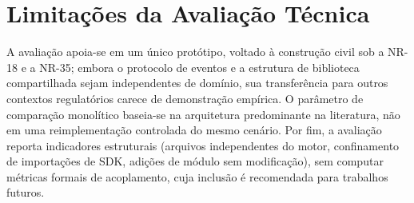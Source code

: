 \section{Limitações da Avaliação Técnica}

A avaliação apoia-se em um único protótipo, voltado à construção civil sob a NR-18 e a NR-35; embora o protocolo de eventos e a estrutura de biblioteca compartilhada sejam independentes de domínio, sua transferência para outros contextos regulatórios carece de demonstração empírica. O parâmetro de comparação monolítico baseia-se na arquitetura predominante na literatura, não em uma reimplementação controlada do mesmo cenário. Por fim, a avaliação reporta indicadores estruturais (arquivos independentes do motor, confinamento de importações de SDK, adições de módulo sem modificação), sem computar métricas formais de acoplamento, cuja inclusão é recomendada para trabalhos futuros.
